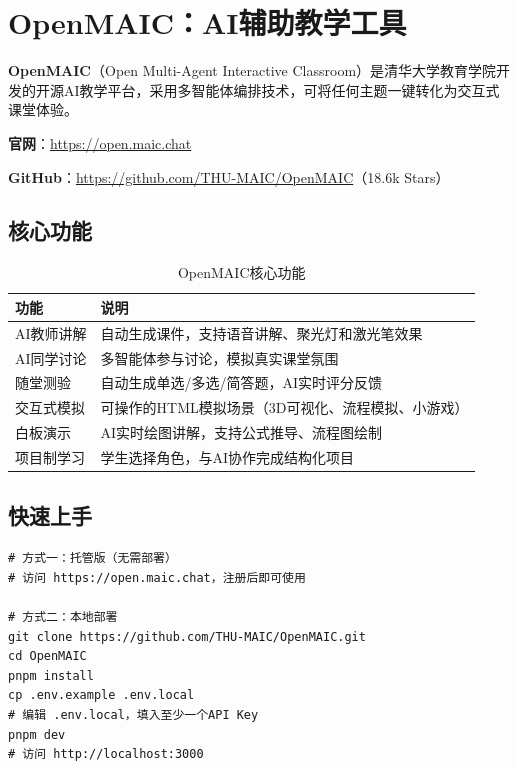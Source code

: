 
\section{OpenMAIC：AI辅助教学工具}

\textbf{OpenMAIC}（Open Multi-Agent Interactive Classroom）是清华大学教育学院开发的开源AI教学平台，采用多智能体编排技术，可将任何主题一键转化为交互式课堂体验。

\textbf{官网}：\url{https://open.maic.chat}

\textbf{GitHub}：\url{https://github.com/THU-MAIC/OpenMAIC}（18.6k Stars）

\subsection{核心功能}

\begin{table}[H]
\centering
\begin{tabular}{lp{7cm}}
\toprule
\textbf{功能} & \textbf{说明} \\
\midrule
AI教师讲解 & 自动生成课件，支持语音讲解、聚光灯和激光笔效果 \\
AI同学讨论 & 多智能体参与讨论，模拟真实课堂氛围 \\
随堂测验 & 自动生成单选/多选/简答题，AI实时评分反馈 \\
交互式模拟 & 可操作的HTML模拟场景（3D可视化、流程模拟、小游戏） \\
白板演示 & AI实时绘图讲解，支持公式推导、流程图绘制 \\
项目制学习 & 学生选择角色，与AI协作完成结构化项目 \\
\bottomrule
\end{tabular}
\caption{OpenMAIC核心功能}
\end{table}

\subsection{快速上手}

\begin{lstlisting}[style=shell]
# 方式一：托管版（无需部署）
# 访问 https://open.maic.chat，注册后即可使用

# 方式二：本地部署
git clone https://github.com/THU-MAIC/OpenMAIC.git
cd OpenMAIC
pnpm install
cp .env.example .env.local
# 编辑 .env.local，填入至少一个API Key
pnpm dev
# 访问 http://localhost:3000
\end{lstlisting}

